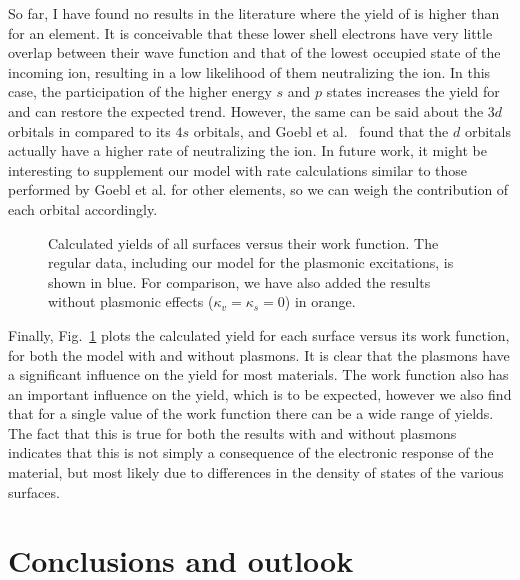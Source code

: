 \begin{refsection}
So far, I have found no results in the literature where the yield of  
is higher than  for an element. It is conceivable that these lower 
shell electrons have very little overlap between their wave function and that of 
the lowest occupied state of the incoming ion, resulting in a low likelihood 
of them neutralizing the ion. In this case, the participation of the higher 
energy $s$ and $p$ states increases the yield for  and can restore 
the expected trend. However, the same can be said 
about the $3d$ orbitals in  compared to its $4s$ orbitals, and Goebl 
et al.~\cite{Goebl2011} found that the $d$ orbitals actually have a higher 
rate of neutralizing the ion. In future work, it might be interesting to supplement our model 
with rate calculations similar to those performed by Goebl et al. for other 
elements, so we can weigh the contribution of each orbital accordingly. 

{
\begin{figure}[ht] 
\centering 
\captionsetup{width=0.9\textwidth}
 
\caption{Calculated yields of all surfaces versus their work function. The 
regular data, including our model for the plasmonic excitations, is shown in 
blue. For comparison, we have also added the results without plasmonic effects 
($\kappa_v = \kappa_s = 0$) in orange.} 
\label{quotas:fig-versus_workfun} 
\end{figure}
}
 
Finally, Fig.~\ref{quotas:fig-versus_workfun} plots the calculated yield for 
each surface versus its work function, for both the model with and without 
plasmons. It is clear that the plasmons have a significant influence on the 
yield for most materials. The work function also has an important influence on 
the yield, which is to be expected, however we also find that for a single 
value of the work function there can be a wide range of yields. The fact that 
this is true for both the results with and without plasmons indicates that 
this is not simply a consequence of the electronic response of the material, 
but most likely due to differences in the density of states of the various 
surfaces. 
 
\section{Conclusions and outlook} 


\end{refsection}
